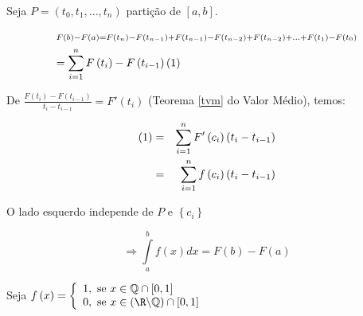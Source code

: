 \documentclass[11pt, oneside, a4paper]{gsm-l}
\begin{document}
\begin{dem}
    Seja $P = \left( {t_0 ,t_1 ,...,t_n } \right)$ partição de $\left[ {a,b} \right]$.

\[
\begin{gathered}
  \scriptstyle {F\left( b \right) - F\left( a \right) = F\left( {t_n } \right) - F\left( {t_{n - 1} } \right) + F\left( {t_{n - 1} } \right) - F\left( {t_{n - 2} } \right) + F\left( {t_{n - 2} } \right) + ... + F\left( {t_1 } \right) - F\left( {t_0 } \right)} \hfill \\
   = \sum\limits_{i = 1}^n {F\left( {t_i } \right) - F\left( {t_{i - 1} } \right)} \left( 1 \right) \hfill \\
\end{gathered}
\]

    De $\displaystyle \frac{{F\left( {t_i } \right) - F\left( {t_{i - 1} } \right)}}
{{t_i  - t_{i - 1} }} = F'\left( {t_i } \right)$ (Teorema \ref{tvm} do Valor Médio), temos:

\begin{eqnarray*}
      \left( 1 \right) &=& \sum\limits_{i = 1}^n {F'\left( {c_i } \right)\left( {t_i  - t_{i - 1} } \right)}  \hfill \\
       &=& \sum\limits_{i = 1}^n {f\left( {c_i } \right)\left( {t_i  - t_{i - 1} } \right)}  \hfill \\
\end{eqnarray*}

O lado esquerdo independe de $P$ e $\left\{ {c_i } \right\}$

\[
     \Rightarrow \int\limits_a^b {f\left( x \right)dx}  = F\left( b \right) - F\left( a \right)
\]

\end{dem}

\begin{exem}

Seja $f\left( x \right) = \left\{ {\begin{array}{l}
1,\mbox{ se }x \in \mathbb{Q} \cap \left[ {0,1} \right] \\
0,\mbox{ se }x \in \left( {\R\backslash \mathbb{Q}} \right) \cap
\left[ {0,1} \right] \\
\end{array}} \right.$

\end{exem}
\end{document}
